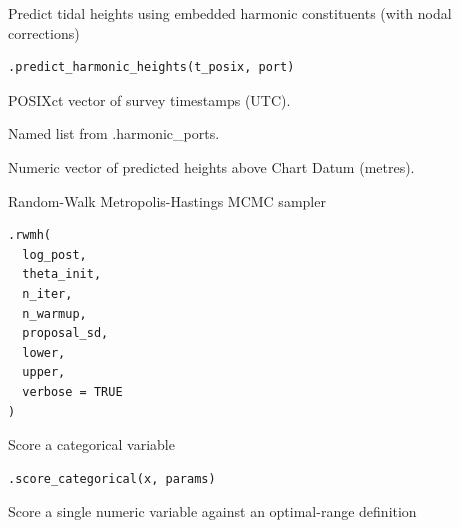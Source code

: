 \documentclass[a4paper]{book}
\begin{document}
%
\begin{Description}
Predict tidal heights using embedded harmonic constituents (with nodal corrections)
\end{Description}
%
\begin{Usage}
\begin{verbatim}
.predict_harmonic_heights(t_posix, port)
\end{verbatim}
\end{Usage}
%
\begin{Arguments}
\begin{ldescription}
\item[\code{t\_posix}] POSIXct vector of survey timestamps (UTC).

\item[\code{port}] Named list from .harmonic\_ports.
\end{ldescription}
\end{Arguments}
%
\begin{Value}
Numeric vector of predicted heights above Chart Datum (metres).
\end{Value}
%
\begin{Description}
Random-Walk Metropolis-Hastings MCMC sampler
\end{Description}
%
\begin{Usage}
\begin{verbatim}
.rwmh(
  log_post,
  theta_init,
  n_iter,
  n_warmup,
  proposal_sd,
  lower,
  upper,
  verbose = TRUE
)
\end{verbatim}
\end{Usage}
%
\begin{Description}
Score a categorical variable
\end{Description}
%
\begin{Usage}
\begin{verbatim}
.score_categorical(x, params)
\end{verbatim}
\end{Usage}
%
\begin{Description}
Score a single numeric variable against an optimal-range definition
\end{Description}
\end{document}
